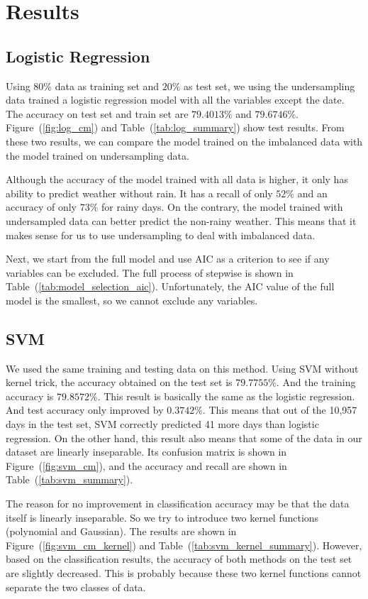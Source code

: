 \documentclass[11pt, a4paper, jou]{apa7}
\begin{document}
\section{Results}

\subsection{Logistic Regression}
    Using $80\%$ data as training set and $20\%$ as test set, we using the undersampling data trained a logistic regression model with all the variables except the date. The accuracy on test set and train set are $79.4013\%$ and $79.6746\%$. Figure~(\ref{fig:log_cm}) and Table~(\ref{tab:log_summary}) show test results. From these two results, we can compare the model trained on the imbalanced data with the model trained on undersampling data. 

    Although the accuracy of the model trained with all data is higher, it only has ability to predict weather without rain. It has a recall of only $52\%$ and an accuracy of only $73\%$ for rainy days. On the contrary, the model trained with undersampled data can better predict the non-rainy weather. This means that it makes sense for us to use undersampling to deal with imbalanced data. 

    Next, we start from the full model and use AIC as a criterion to see if any variables can be excluded. The full process of stepwise is shown in Table~(\ref{tab:model_selection_aic}). Unfortunately, the AIC value of the full model is the smallest, so we cannot exclude any variables. 

\subsection{SVM}
    We used the same training and testing data on this method. Using SVM without kernel trick, the accuracy obtained on the test set is $79.7755\%$. And the training accuracy is $79.8572\%$. This result is basically the same as the logistic regression. And test accuracy only improved by $0.3742\%$. This means that out of the 10,957 days in the test set, SVM correctly predicted 41 more days than logistic regression. On the other hand, this result also means that some of the data in our dataset are linearly inseparable. Its confusion matrix is shown in Figure~(\ref{fig:svm_cm}), and the accuracy and recall are shown in Table~(\ref{tab:svm_summary}). 

    The reason for no improvement in classification accuracy may be that the data itself is linearly inseparable. So we try to introduce two kernel functions (polynomial and Gaussian). The results are shown in Figure~(\ref{fig:svm_cm_kernel}) and Table~(\ref{tab:svm_kernel_summary}). However, based on the classification results, the accuracy of both methods on the test set are slightly decreased. This is probably because these two kernel functions cannot separate the two classes of data. 
\end{document}
